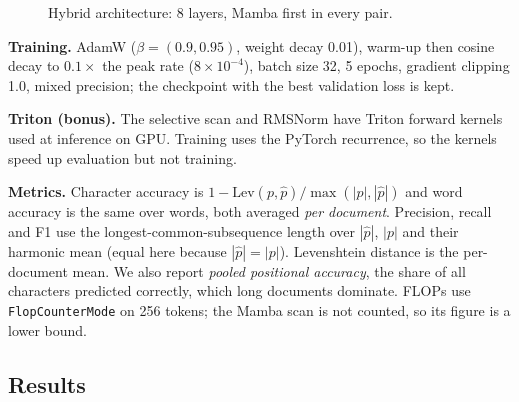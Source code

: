 \documentclass[12pt,a4paper]{article}
\begin{document}
\begin{figure}[h]
\centering
{}
\caption{Hybrid architecture: 8 layers, Mamba first in every pair.}
\label{fig:arch}
\end{figure}

\textbf{Training.} AdamW ($\beta{=}(0.9,0.95)$, weight decay 0.01), warm-up then cosine decay to $0.1\times$ the peak rate ($8\times 10^{-4}$), batch size 32, 5 epochs, gradient clipping 1.0, mixed precision; the checkpoint with the best validation loss is kept.

\textbf{Triton (bonus).} The selective scan and RMSNorm have Triton forward kernels used at inference on GPU. Training uses the PyTorch recurrence, so the kernels speed up evaluation but not training.

\textbf{Metrics.} Character accuracy is $1-\mathrm{Lev}(p,\hat p)/\max(|p|,|\hat p|)$ and word accuracy is the same over words, both averaged \emph{per document}. Precision, recall and F1 use the longest-common-subsequence length over $|\hat p|$, $|p|$ and their harmonic mean (equal here because $|\hat p|=|p|$). Levenshtein distance is the per-document mean. We also report \emph{pooled positional accuracy}, the share of all characters predicted correctly, which long documents dominate. FLOPs use \texttt{FlopCounterMode} on 256 tokens; the Mamba scan is not counted, so its figure is a lower bound.

\subsection{Results}
\end{document}

